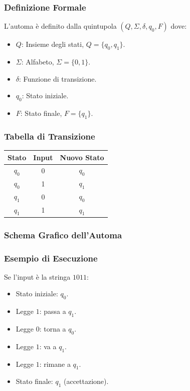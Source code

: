 \documentclass[a4paper,12pt]{report}
\begin{document}
\subsubsection*{Definizione Formale}
L'automa \`e definito dalla quintupola $(Q, \Sigma, \delta, q_0, F)$ dove:
\begin{itemize}
    \item $Q$: Insieme degli stati, $Q = \{q_0, q_1\}$.
    \item $\Sigma$: Alfabeto, $\Sigma = \{0, 1\}$.
    \item $\delta$: Funzione di transizione.
    \item $q_0$: Stato iniziale.
    \item $F$: Stato finale, $F = \{q_1\}$.
\end{itemize}

\subsubsection*{Tabella di Transizione}
\begin{center}
\begin{tabular}{|c|c|c|}
    \hline
    Stato & Input & Nuovo Stato \\
    \hline
    $q_0$ & 0 & $q_0$ \\
    $q_0$ & 1 & $q_1$ \\
    $q_1$ & 0 & $q_0$ \\
    $q_1$ & 1 & $q_1$ \\
    \hline
\end{tabular}
\end{center}

\subsubsection*{Schema Grafico dell'Automa}
\begin{center}
\end{center}

\subsubsection*{Esempio di Esecuzione}
Se l'input \`e la stringa $1011$:
\begin{itemize}
    \item Stato iniziale: $q_0$.
    \item Legge $1$: passa a $q_1$.
    \item Legge $0$: torna a $q_0$.
    \item Legge $1$: va a $q_1$.
    \item Legge $1$: rimane a $q_1$.
    \item Stato finale: $q_1$ (accettazione).
\end{itemize}
\end{document}
